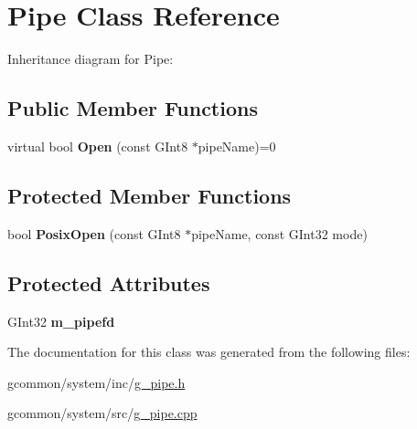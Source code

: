 \hypertarget{class_pipe}{\section{Pipe Class Reference}
\label{class_pipe}
}


Inheritance diagram for Pipe\-:
\subsection*{Public Member Functions}
\begin{DoxyCompactItemize}
\item 
\hypertarget{class_pipe_aee00aabd9aaba6e7ed6e4c39ed330b2c}{virtual bool {\bfseries Open} (const G\-Int8 $\ast$pipe\-Name)=0}\label{class_pipe_aee00aabd9aaba6e7ed6e4c39ed330b2c}

\end{DoxyCompactItemize}
\subsection*{Protected Member Functions}
\begin{DoxyCompactItemize}
\item 
\hypertarget{class_pipe_af12b6ee086bfce472bcad0e6c7dd030f}{bool {\bfseries Posix\-Open} (const G\-Int8 $\ast$pipe\-Name, const G\-Int32 mode)}\label{class_pipe_af12b6ee086bfce472bcad0e6c7dd030f}

\end{DoxyCompactItemize}
\subsection*{Protected Attributes}
\begin{DoxyCompactItemize}
\item 
\hypertarget{class_pipe_a7776259caf82021e2ac6e1de6a14941b}{G\-Int32 {\bfseries m\-\_\-pipefd}}\label{class_pipe_a7776259caf82021e2ac6e1de6a14941b}

\end{DoxyCompactItemize}


The documentation for this class was generated from the following files\-:\begin{DoxyCompactItemize}
\item 
gcommon/system/inc/\hyperlink{g__pipe_8h}{g\-\_\-pipe.\-h}\item 
gcommon/system/src/\hyperlink{g__pipe_8cpp}{g\-\_\-pipe.\-cpp}\end{DoxyCompactItemize}
